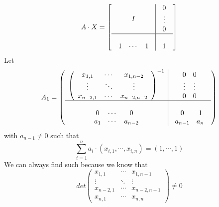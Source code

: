 \begin{example}
\[
	A\cdot X=
	\left[
	\begin{array}{c|c}
		I
		&
		\begin{array}{c}
			0  \\
			\vdots \\
			0
		\end{array}\\
		\hline\\
		\begin{array}{ccc}
			1&\cdots&1
		\end{array}
		&
		1				 
	\end{array}	
	\right]
\]
Let
\[
	A_1=
	\left(\begin{array}{c|c}
		\left(\begin{array}{ccc}
			x_{1,1}&\cdots&x_{1,n-2}\\
			\vdots&\ddots&\vdots\\
			x_{n-2,1}&\cdots&x_{n-2,n-2}
		\end{array}\right)^{-1}
		&
		\begin{array}{cc}
			0&0\\
			\vdots&\vdots\\
			0&0
		\end{array}		
		\\
		\hline\\
		\begin{array}{ccc}
			0&\cdots&0\\
			a_1&\cdots&a_{n-2}
		\end{array}
		&
		\begin{array}{cc}
			0&1\\
			a_{n-1}&a_{n}
		\end{array}
	\end{array}\right)
\]
with $a_{n-1}\neq 0$ such that 
\[
\sum_{i=1}^{n} a_{i}\cdot (x_{i,1},\cdots,x_{i,n})=(1,\cdots,1)
\]
We can always find such because we know that
\[
		det
		\left( \begin{array}{ccc}
			x_{1,1}&\cdots &x_{1,n-1}\\
			\vdots &\ddots & \vdots \\
			x_{n-2,1}&\cdots &x_{n-2,n-1}\\
			x_{n,1}&\cdots & x_{n,n}
		\end{array}\right)
		\neq 0
\]


\end{example}
